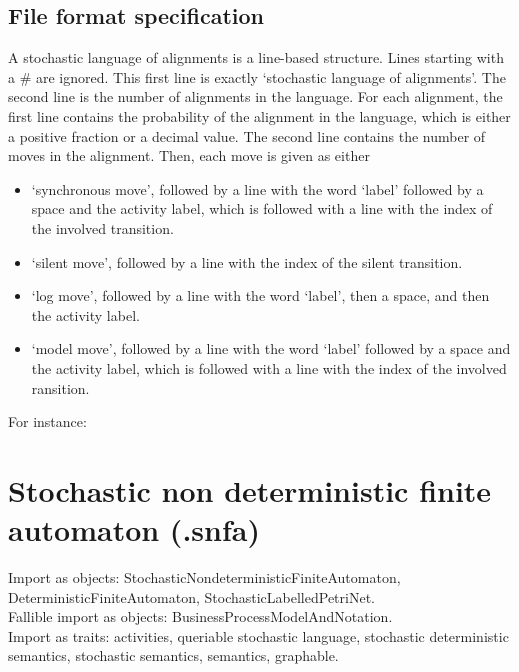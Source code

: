 {\subsection*{File format specification}A stochastic language of alignments is a line-based structure. Lines starting with a \# are ignored.
    This first line is exactly `stochastic language of alignments'.
    The second line is the number of alignments in the language.
    For each alignment, the first line contains the probability of the alignment in the language, which is either a positive fraction or a decimal value.
    The second line contains the number of moves in the alignment.
    Then, each move is given as either 
    \begin{itemize}
        \item `synchronous move', followed by a line with the word `label' followed by a space and the activity label, which is followed with a line with the index of the involved transition.
        \item `silent move', followed by a line with the index of the silent transition.
        \item `log move', followed by a line with the word `label', then a space, and then the activity label.
        \item `model move', followed by a line with the word `label' followed by a space and the activity label, which is followed with a line with the index of the involved ransition.
    \end{itemize}
    
    For instance:
    
\clearpage
\section{Stochastic non deterministic finite automaton (.snfa)}
\label{filehandler:stochastic non-deterministic finite automaton}
Import as objects: StochasticNondeterministicFiniteAutomaton, DeterministicFiniteAutomaton, StochasticLabelledPetriNet.
\\Fallible import as objects: BusinessProcessModelAndNotation.
\\Import as traits: activities, queriable stochastic language, stochastic deterministic semantics, stochastic semantics, semantics, graphable.
}
